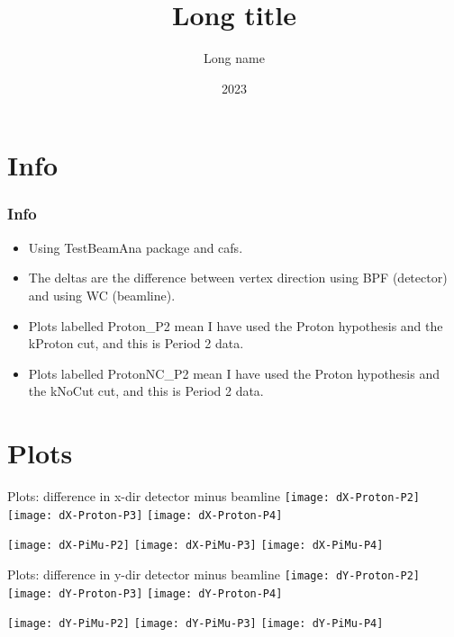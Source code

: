 \documentclass[11.5pt,sans,english]{beamer}
\title[ Short title]{Long title}
\author[Short name]{Long name}
\date[2023]{2023}
\begin{document}
\begin{frame}
\titlepage
\end{frame} 

\section{Info}

\begin{frame}
\frametitle{Info} 
\normalsize
\begin{itemize}
\item Using TestBeamAna package and cafs.\\[3ex]
\item The deltas are the difference between vertex direction using BPF (detector) and using WC (beamline).\\[3ex]
\item Plots labelled Proton\_P2 mean I have used the Proton hypothesis and the kProton cut, and this is Period 2 data.\\[3ex]
\item Plots labelled ProtonNC\_P2 mean I have used the Proton hypothesis and the kNoCut cut, and this is Period 2 data.\\[3ex]
\end{itemize}
\end{frame} 

\section{Plots }

\begin{frame}{Plots: difference in x-dir detector minus beamline}
\texttt{[image: dX-Proton-P2]}
\texttt{[image: dX-Proton-P3]}
\texttt{[image: dX-Proton-P4]}

\texttt{[image: dX-PiMu-P2]}
\texttt{[image: dX-PiMu-P3]}
\texttt{[image: dX-PiMu-P4]}

\end{frame}

\begin{frame}{Plots: difference in y-dir detector minus beamline}
\texttt{[image: dY-Proton-P2]}
\texttt{[image: dY-Proton-P3]}
\texttt{[image: dY-Proton-P4]}

\texttt{[image: dY-PiMu-P2]}
\texttt{[image: dY-PiMu-P3]}
\texttt{[image: dY-PiMu-P4]}

\end{frame}
\end{document}

